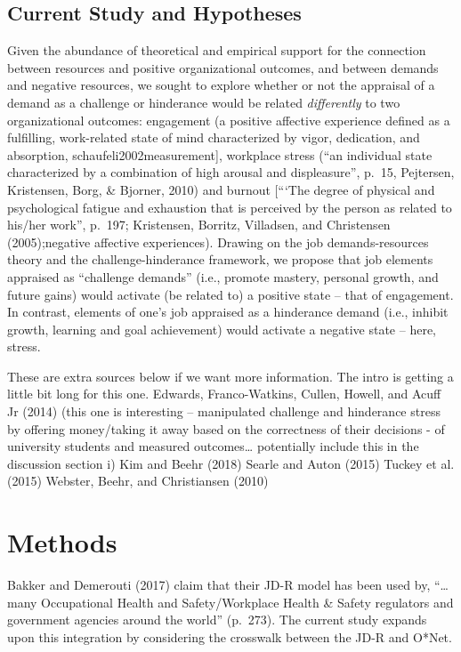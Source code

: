 \documentclass[
  english,
  man]{apa6}
\begin{document}
\hypertarget{current-study-and-hypotheses-1}{%
\subsection{Current Study and Hypotheses}\label{current-study-and-hypotheses-1}}

Given the abundance of theoretical and empirical support for the connection between resources and positive organizational outcomes, and between demands and negative resources, we sought to explore whether or not the appraisal of a demand as a challenge or hinderance would be related \emph{differently} to two organizational outcomes: engagement (a positive affective experience defined as a fulfilling, work-related state of mind characterized by vigor, dedication, and absorption, schaufeli2002measurement{]}, workplace stress (``an individual state characterized by a combination of high arousal and displeasure'', p.~15, Pejtersen, Kristensen, Borg, \& Bjorner, 2010) and burnout {[}\enquote{`The degree of physical and psychological fatigue and exhaustion that is perceived by the person as related to his/her work}, p.~197; Kristensen, Borritz, Villadsen, and Christensen (2005);negative affective experiences). Drawing on the job demands-resources theory and the challenge-hinderance framework, we propose that job elements appraised as \enquote{challenge demands} (i.e., promote mastery, personal growth, and future gains) would activate (be related to) a positive state -- that of engagement. In contrast, elements of one's job appraised as a hinderance demand (i.e., inhibit growth, learning and goal achievement) would activate a negative state -- here, stress.

These are extra sources below if we want more information. The intro is getting a little bit long for this one.
Edwards, Franco-Watkins, Cullen, Howell, and Acuff Jr (2014) (this one is interesting -- manipulated challenge and hinderance stress by offering money/taking it away based on the correctness of their decisions - of university students and measured outcomes\ldots{} potentially include this in the discussion section i)
Kim and Beehr (2018)
Searle and Auton (2015)
Tuckey et al. (2015)
Webster, Beehr, and Christiansen (2010)

\hypertarget{methods}{%
\section{Methods}\label{methods}}

Bakker and Demerouti (2017) claim that their JD-R model has been used by, \enquote{\ldots many Occupational Health and Safety/Workplace Health \& Safety regulators and government agencies around the world} (p.~273). The current study expands upon this integration by considering the crosswalk between the JD-R and O*Net.
\end{document}
